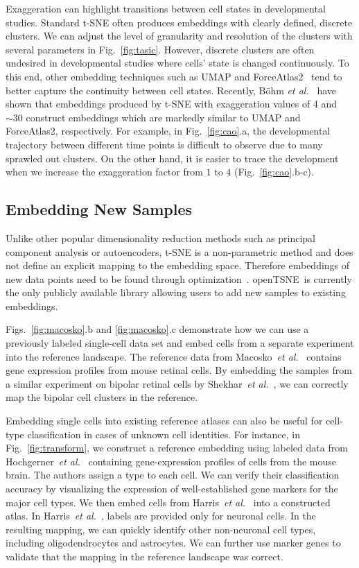 \documentclass[twocolumn]{article}
\newcommand{\opentsne}{\textsf{openTSNE}}
\begin{document}
Exaggeration can highlight transitions between cell states in developmental
studies. Standard t-SNE often produces embeddings with clearly defined, discrete
clusters. We can adjust the level of granularity and resolution of the clusters
with several parameters in Fig.~\ref{fig:tasic}. However, discrete clusters are
often undesired in developmental studies where cells' state is changed
continuously. To this end, other embedding techniques such as UMAP and
ForceAtlas2~\cite{jacomy2014forceatlas2} tend to better capture the continuity
between cell states. Recently, B{\"o}hm \textit{et al.}~\cite{bohm2020unifying}
have shown that embeddings produced by t-SNE with exaggeration values of 4 and
$\sim30$ construct embeddings which are markedly similar to UMAP and
ForceAtlas2, respectively. For example, in Fig.~\ref{fig:cao}.a, the
developmental trajectory between different time points is difficult to observe
due to many sprawled out clusters. On the other hand, it is easier to trace the
development when we increase the exaggeration factor from $1$ to $4$
(Fig.~\ref{fig:cao}.b-c).

\subsection*{Embedding New Samples}

Unlike other popular dimensionality reduction methods such as principal
component analysis or autoencoders, t-SNE is a non-parametric method and does
not define an explicit mapping to the embedding space. Therefore embeddings of
new data points need to be found through
optimization~\cite{policar2019embedding}. \opentsne\ is currently the only
publicly available library allowing users to add new samples to existing
embeddings.

Figs.~\ref{fig:macosko}.b and \ref{fig:macosko}.c demonstrate how we can use a
previously labeled single-cell data set and embed cells from a separate
experiment into the reference landscape. The reference data from
Macosko~\textit{et al.}~\cite{macosko2015highly} contains gene expression
profiles from mouse retinal cells. By embedding the samples from a similar
experiment on bipolar retinal cells by Shekhar~\textit{et
al.}~\cite{shekhar2016comprehensive}, we can correctly map the bipolar cell
clusters in the reference.

Embedding single cells into existing reference atlases can also be useful for
cell-type classification in cases of unknown cell identities. For instance, in
Fig.~\ref{fig:transform}, we construct a reference embedding using labeled data
from Hochgerner~\textit{et al.}~\cite{hochgerner2018conserved} containing
gene-expression profiles of cells from the mouse brain. The authors assign a
type to each cell. We can verify their classification accuracy by visualizing
the expression of well-established gene markers for the major cell types. We
then embed cells from Harris~\textit{et al.}~\cite{harris2018classes} into a
constructed atlas. In Harris~\textit{et al.}~, labels are provided only for
neuronal cells. In the resulting mapping, we can quickly identify other
non-neuronal cell types, including oligodendrocytes and astrocytes. We can
further use marker genes to validate that the mapping in the reference landscape
was correct. 
\end{document}
